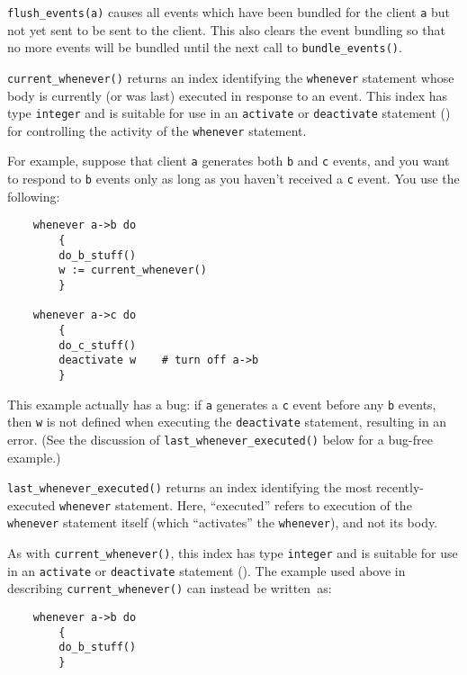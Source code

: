 \begin{sloppy}
\begin{list}{}{}
\item[{\tt flush\_events(a)}] \label{flush_events-func}
causes all events which have been bundled for the client {\tt a} but not yet
sent to be sent to the client. This also
clears the event bundling so that no more events will be bundled until
the next call to {\tt bundle\_events()}.

\item[{\tt current\_whenever()}] \label{current_whenever-func}
returns an index identifying the {\tt whenever} statement whose body
is currently (or was last) executed in response to an event.
This index has type {\tt integer} and is suitable for use in an {\tt activate}
or {\tt deactivate} statement () for controlling the
activity of the {\tt whenever} statement.

For example, suppose that client {\tt a} generates both {\tt b} and {\tt c}
events, and you want to respond to {\tt b} events only as long as you
haven't received a {\tt c} event.  You use the following:
\begin{verbatim}
    whenever a->b do
        {
        do_b_stuff()
        w := current_whenever()
        }

    whenever a->c do
        {
        do_c_stuff()
        deactivate w    # turn off a->b
        }
\end{verbatim}
This example actually has a bug: if {\tt a} generates a {\tt c} event
before any {\tt b} events, then {\tt w} is not  defined when
executing the {\tt deactivate} statement, resulting in an error.  (See
the discussion of {\tt last\_whenever\_executed()} below for a bug-free
example.)

\item[{\tt last\_whenever\_executed()}] \label{last_whenever_executed-func}
returns an index identifying the most recently-executed {\tt whenever}
statement.  Here, ``executed'' refers to execution of the {\tt whenever}
statement itself (which ``activates'' the {\tt whenever}), and not its body.

As with {\tt current\_whenever()}, this index has type {\tt integer} and
is suitable for use in an {\tt activate} or {\tt deactivate} statement
().  The example used above in describing
{\tt current\_whenever()} can instead be written~as:
\begin{verbatim}
    whenever a->b do
        {
        do_b_stuff()
        }


\end{verbatim}
\end{list}
\end{sloppy}
